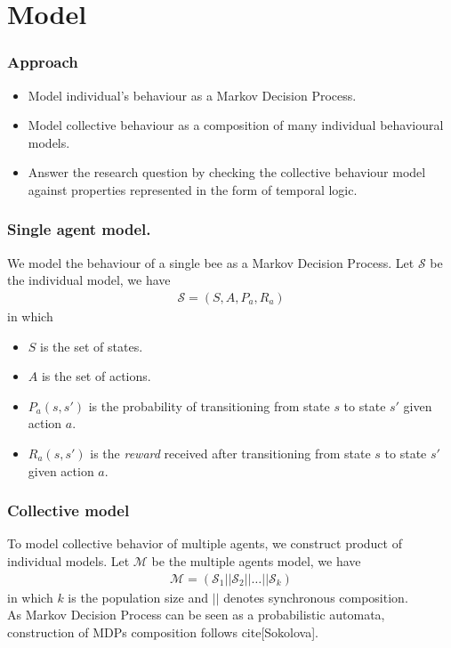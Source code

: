 \documentclass{beamer}
\begin{document}
\section{Model}
\begin{frame}
  \frametitle{Approach}
  \begin{itemize}
  \item Model individual's behaviour as a Markov Decision Process.
  \item Model collective behaviour as a composition of many individual
    behavioural models.
  \item Answer the research question by checking the collective behaviour model
    against properties represented in the form of temporal logic.
  \end{itemize}
\end{frame}

\begin{frame}
  \frametitle{Single agent model.}
  We model the behaviour of a single bee as a Markov Decision Process. Let
  $\mathcal{S}$ be the individual model, we have
  \begin{align*}
    \mathcal{S} = (S, A, P_a, R_a)
  \end{align*}
  in which
  \begin{itemize}
  \item $S$ is the set of states.
  \item $A$ is the set of actions.
  \item $P_a(s,s')$ is the probability of transitioning from state $s$ to state
    $s'$ given action $a$.
  \item $R_a(s,s')$ is the \textit{reward} received after transitioning from
    state $s$ to state $s'$ given action $a$.
  \end{itemize}
\end{frame}

\begin{frame}
  \frametitle{Collective model}
  To model collective behavior of multiple agents, we construct
  product of individual models. Let $\mathcal{M}$ be the multiple agents model,
  we have
  \begin{align*}
    \mathcal{M} = (\mathcal{S}_1||\mathcal{S}_2||\ldots||\mathcal{S}_k) 
  \end{align*}
  in which $k$ is the population size and $||$ denotes synchronous composition.\\
  As Markov Decision Process can be seen as a probabilistic automata,
  construction of MDPs composition follows cite[Sokolova].
\end{frame}
\end{document}

